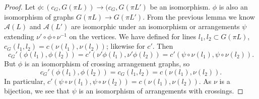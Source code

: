 \documentclass[11pt, oneside]{article}
\begin{document}
\begin{proof}
Let $\phi:(c_G, G(\pi L)) \to (c_G, G(\pi L')$ be an isomorphism. $\phi$ is also an isomorphism of graphs $G( \pi L) \to G( \pi L')$. From the previous lemma we know $\mathcal{A}(L)$ and $\mathcal{A}(L')$ are isomorphic under an isomorphism or arrangements $\psi$ extending $\nu' \circ \phi \circ \nu^{-1}$ on the vertices. We have defined for lines $l_1, l_2 \subset G( \pi L)$, $c_G(l_1, l_2) = c(\nu (l_1), \nu (l_2))$; likewise for $c'$. Then $$c_G'(\phi (l_1), \phi (l_2)) = c'(\nu' \phi (l_1), \nu' \phi (l_2)) = c' (\psi \circ \nu (l_1), \psi \circ \nu (l_2)).$$ 
But $\phi$ is an isomorphism of crossing arrangement graphs, so 
$$c_G'(\phi (l_1), \phi (l_2))= c_G(l_1, l_2) = c(\nu (l_1), \nu (l_2)).$$
In particular, $c' (\psi \circ \nu (l_1), \psi \circ \nu (l_2))= c(\nu (l_1), \nu (l_2))$. As $\nu$ is a bijection, we see that $\psi$ is an isomorphism of arrangements with crossings. \end{proof}
\end{document}
